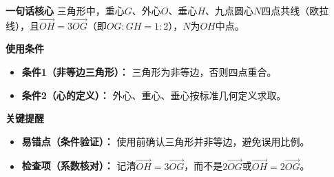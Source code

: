 \begin{summarybox}
	\textbf{\textcolor{CSummary}{一句话核心}}
	三角形中，重心$G$、外心$O$、垂心$H$、九点圆心$N$四点共线（欧拉线），且$\overrightarrow{OH}=3\overrightarrow{OG}$（即$OG:GH=1:2$），$N$为$OH$中点。

	\medskip
	\textbf{\textcolor{CSummary}{使用条件}}
	\begin{itemize}[leftmargin=*, itemsep=0.5em, topsep=0.4em]
		\item \textbf{条件1（非等边三角形）：} 三角形为非等边，否则四点重合。
		\item \textbf{条件2（心的定义）：} 外心、重心、垂心按标准几何定义求取。
	\end{itemize}

	\medskip
	\textbf{\textcolor{CSummary}{关键提醒}}
	\begin{itemize}[leftmargin=*, itemsep=0.5em, topsep=0.4em]
		\item \textbf{易错点（条件验证）：} 使用前确认三角形并非等边，避免误用比例。
		\item \textbf{检查项（系数核对）：} 记清$\overrightarrow{OH}=3\overrightarrow{OG}$，而不是$2\overrightarrow{OG}$或$\overrightarrow{OH}=2\overrightarrow{OG}$。
	\end{itemize}

\end{summarybox}
